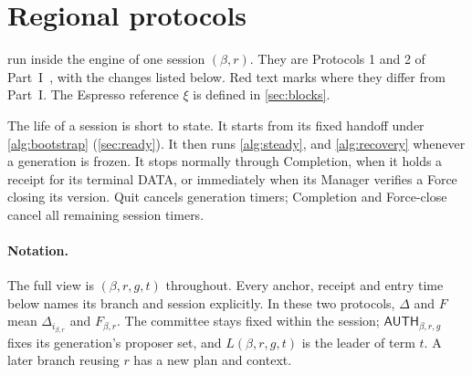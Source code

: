 \documentclass[11pt,a4paper]{article}
\newcommand{\RR}[1]{{\color{rrRed}#1}}
\newcommand{\tagg}[1]{\ensuremath{\mathsf{#1}}}
\newcounter{protocol}
\begin{document}
\section{Regional protocols}
\label{sec:protocols}
 run inside the engine of one session
$(\beta,r)$. They are Protocols 1 and 2 of Part~I~\cite{part1}, with the
changes listed below. \RR{Red text} marks where they differ from Part~I.
The Espresso reference $\xi$ is defined in \cref{sec:blocks}.

The life of a session is short to state. It starts from its fixed
handoff under \cref{alg:bootstrap} (\cref{sec:ready}). It then runs
\cref{alg:steady}, and \cref{alg:recovery} whenever a generation is
frozen. It stops normally through Completion, when it holds a receipt
for its terminal DATA, or immediately when its Manager verifies a Force
closing its version. Quit cancels generation timers; Completion and
Force-close cancel all remaining session timers.

\paragraph{Notation.}
The full view is $(\beta,r,g,t)$ throughout. Every anchor, receipt and
entry time below names its branch and session explicitly. In these two
protocols, $\Delta$ and $F$ mean $\Delta_{i_{\beta,r}}$ and
$F_{\beta,r}$. The committee stays fixed within the session;
$\tagg{AUTH}_{\beta,r,g}$ fixes its generation's proposer set, and
$L(\beta,r,g,t)$ is the leader of term $t$. A later branch reusing $r$
has a new plan and context.
\end{document}

